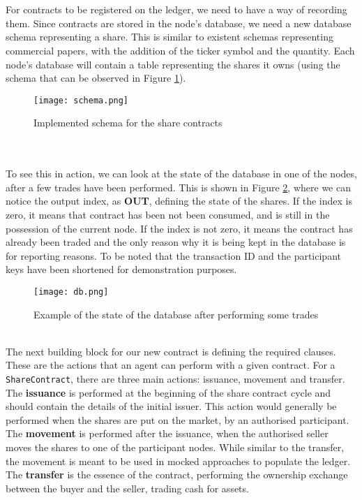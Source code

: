 \documentclass[12pt,twoside]{article}
\begin{document}
\\ \\
For contracts to be registered on the ledger, we need to have a way of recording them. Since contracts are stored in the node's database, we need a new database schema representing a share. This is similar to existent schemas representing commercial papers, with the addition of the ticker symbol and the quantity. Each node's database will contain a table representing the shares it owns (using the schema that can be observed in Figure \ref{fig:schema}).
\begin{figure}[!htb]
\centering
\texttt{[image: schema.png]}
\caption{Implemented schema for the share contracts}
\centering
\label{fig:schema}
\end{figure}
\\ \\
To see this in action, we can look at the state of the database in one of the nodes, after a few trades have been performed. This is shown in Figure \ref{fig:db}, where we can notice the output index, as \textbf{OUT}, defining the state of the shares. If the index is zero, it means that contract has been not been consumed, and is still in the possession of the current node. If the index is not zero, it means the contract has already been traded and the only reason why it is being kept in the database is for reporting reasons. To be noted that the transaction ID and the participant keys have been shortened for demonstration purposes.
\begin{figure}[!htb]
\centering
\texttt{[image: db.png]}
\caption{Example of the state of the database after performing some trades}
\centering
\label{fig:db}
\end{figure} 
\\
The next building block for our new contract is defining the required clauses. These are the actions that an agent can perform with a given contract. For a \verb|ShareContract|, there are three main actions: issuance, movement and transfer. The \textbf{issuance} is performed at the beginning of the share contract cycle and should contain the details of the initial issuer. This action would generally be performed when the shares are put on the market, by an authorised participant. The \textbf{movement} is performed after the issuance, when the authorised seller moves the shares to one of the participant nodes. While similar to the transfer, the movement is meant to be used in mocked approaches to populate the ledger. The \textbf{transfer} is the essence of the contract, performing the ownership exchange between the buyer and the seller, trading cash for assets.
\end{document}
